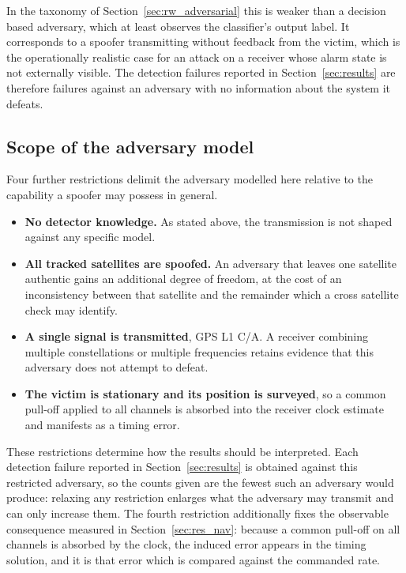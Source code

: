 In the taxonomy of Section~\ref{sec:rw_adversarial} this is weaker than a decision based
adversary, which at least observes the classifier's output label. It corresponds to a
spoofer transmitting without feedback from the victim, which is the operationally
realistic case for an attack on a receiver whose alarm state is not externally visible. The
detection failures reported in Section~\ref{sec:results} are therefore failures against an
adversary with no information about the system it defeats.

\subsection{Scope of the adversary model}

Four further restrictions delimit the adversary modelled here relative to the capability a
spoofer may possess in general.

\begin{itemize}
  \item \textbf{No detector knowledge.} As stated above, the transmission is not shaped
  against any specific model.
  \item \textbf{All tracked satellites are spoofed.} An adversary that leaves one
  satellite authentic gains an additional degree of freedom, at the cost of an
  inconsistency between that satellite and the remainder which a cross satellite check may
  identify.
  \item \textbf{A single signal is transmitted}, GPS L1 C/A. A receiver combining multiple
  constellations or multiple frequencies retains evidence that this adversary does not
  attempt to defeat.
  \item \textbf{The victim is stationary and its position is surveyed}, so a common
  pull-off applied to all channels is absorbed into the receiver clock estimate and
  manifests as a timing error.
\end{itemize}

These restrictions determine how the results should be interpreted. Each detection failure
reported in Section~\ref{sec:results} is obtained against this restricted adversary, so the
counts given are the fewest such an adversary would produce: relaxing any restriction
enlarges what the adversary may transmit and can only increase them. The fourth restriction additionally fixes the observable consequence measured
in Section~\ref{sec:res_nav}: because a common pull-off on all channels is absorbed by the
clock, the induced error appears in the timing solution, and it is that error which is
compared against the commanded rate.
